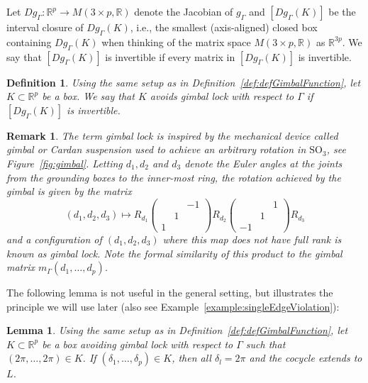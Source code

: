 \documentclass[utopia,fullpage]{nmd/article}
\newcommand\R{\mathbb R}
\newtheorem{lemma}[theorem]{Lemma}
\newtheorem{definition}[theorem]{Definition}
\newtheorem{remark}[theorem]{Remark}
\newcommand\mySO[1]{\mathrm{SO}_{#1}}
\newcommand\myPath{\Gamma}
\begin{document}
Let $Dg_\myPath:\R^p\to M(3\times p, \R)$ denote the Jacobian of $g_\myPath$ and $[Dg_\myPath(K)]$ be the interval closure of $Dg_\myPath(K)$, i.e., the smallest (axis-aligned) closed box containing $Dg_\myPath(K)$ when thinking of the matrix space $M(3\times p, \R)$ as $\R^{3p}$. We say that $[Dg_\myPath(K)]$ is invertible if every matrix in $[Dg_\myPath(K)]$ is invertible.

\begin{definition} \label{def:gimbalLockAvoided}
Using the same setup as in Definition~\ref{def:defGimbalFunction}, let $K\subset \R^p$ be a box. We say that $K$ avoids gimbal lock with respect to $\myPath$ if $[Dg_\myPath(K)]$ is invertible.
\end{definition}

\begin{remark}
The term gimbal lock is inspired by the mechanical device called gimbal or Cardan suspension used to achieve an arbitrary rotation in $\mySO{3}$, see Figure~\ref{fig:gimbal}. Letting $d_1, d_2$ and $d_3$ denote the Euler angles at the joints from the grounding boxes to the inner-most ring, the rotation achieved by the gimbal is given by the matrix
$$(d_1,d_2,d_3)\mapsto R_{d_1} \left(\begin{smallmatrix} &  & -1\\ & 1 & \\ 1 & & \end{smallmatrix}\right) R_{d_2} \left(\begin{smallmatrix} &  & 1\\ & 1 & \\ -1 & & \end{smallmatrix}\right) R_{d_3}$$
and a configuration of $(d_1, d_2, d_3)$ where this map does not have full rank is known as gimbal lock. Note the formal similarity of this product to the gimbal matrix $m_\myPath(d_1,\dots, d_p)$.
\end{remark}

The following lemma is not useful in the general setting, but illustrates the principle we will use later (also see Example~\ref{example:singleEdgeViolation}):

\begin{lemma}
Using the same setup as in Definition~\ref{def:defGimbalFunction}, let $K\subset \R^p$ be a box avoiding gimbal lock with respect to $\myPath$ such that $(2\pi, \dots, 2\pi) \in K$. If $(\delta_1,\dots,\delta_p)\in K$, then all $\delta_l=2\pi$ and the cocycle extends to $L$. \label{lemma:noGimbalImpliesAllEqnsVertexLink}
\end{lemma}
\end{document}

